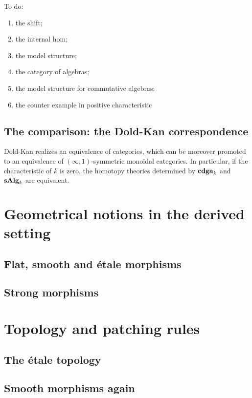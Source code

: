 \begin{refsection}
To do:

\begin{enumerate}
\item the shift;
\item the internal hom;
\item the model structure;
\item the category of algebras;
\item the model structure for commutative algebras;
\item the counter example in positive characteristic
\end{enumerate}

\subsection{The comparison: the Dold-Kan correspondence}

\begin{thm} \label{thm Dold-Kan}
Dold-Kan realizes an equivalence of categories, which can be moreover promoted to an equivalence of $(\infty,1)$-symmetric monoidal categories. In particular, if the characteristic of $k$ is zero, the homotopy theories determined by $\mathbf{cdga}_{k}$ and $\mathbf{s\,\!\mathbf{Alg}}_{k}$ are equivalent.
\end{thm}

\section{Geometrical notions in the derived setting}

\subsection{Flat, smooth and \'etale morphisms}

\subsection{Strong morphisms}

\section{Topology and patching rules}

\subsection{The \'etale topology}

\subsection{Smooth morphisms again}


\end{refsection}
